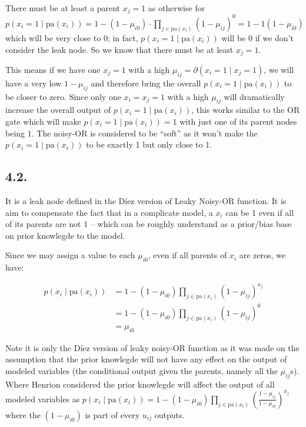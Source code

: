 \documentclass[11pt]{article}
\newcommand{\p}{\partial}
\begin{document}
There must be at least a parent $x_j = 1$ as otherwise for $p(x_i = 1 \mid \textrm{pa}(x_i)) = 1 - (1 - \mu_{i0}) \cdot \prod_{j \in \textrm{pa}(x_i)} (1 - \mu_{ij})^0 = 1 - 1(1 - \mu_{i0})$ which will be very close to $0$; in fact, $p(x_i = 1 \mid \textrm{pa}(x_i))$ will be $0$ if we don't consider the leak node. So we know that there must be at least $x_j = 1$.\newline

This means if we have one $x_j = 1$ with a high $\mu_{ij} = \p(x_i = 1 \mid x_j = 1)$, we will have a very low $1 - \mu_{ij}$ and therefore bring the overall $p(x_i = 1 \mid \textrm{pa}(x_i))$ to be closer to zero. Since only one $x_i = x_j = 1$ with a high $\mu_{ij}$ will dramatically increase the overall output of  $p(x_i = 1 \mid \textrm{pa}(x_i))$, this works similar to the OR gate which will make $p(x_i = 1 \mid \textrm{pa}(x_i)) = 1$ with just one of its parent nodes being $1$. The noisy-OR is considered to be ``soft'' as it won't make the $p(x_i = 1 \mid \textrm{pa}(x_i))$ to be exactly 1 but only close to 1.

\subsection*{4.2.}

It is a leak node defined in the D\'{i}ez version of Leaky Noisy-OR function. It is aim to compensate the fact that in a complicate model, a $x_i$ can be 1 even if all of its parents are not 1 -- which can be roughly understand as a prior/bias base on prior knowlegde to the model.

Since we may assign a value to each $\mu_{i0}$, even if all parents of $x_i$ are zeros, we have:

\begin{align*}
    p(x_i \mid \textrm{pa}({x_i})) &= 1 - (1 - \mu_{i0}) \prod_{j \in \textrm{pa}(x_i)}(1 - \mu_{ij})^{x_j} \\
    &= 1 - (1 - \mu_{i0}) \prod_{j \in \textrm{pa}(x_i)}(1 - \mu_{ij})^0 \\
    &= \mu_{i0}
\end{align*}

Note it is only the D\'{i}ez version of leaky noisy-OR function as it was made on the assumption that the prior knowlegde will not have any effect on the output of modeled variables (the conditional output given the parents, namely all the $\mu_{ij}$s). Where Henrion considered the prior knowlegde will affect the output of all modeled variables as $p(x_i \mid \textrm{pa}({x_i})) = 1 - (1 - \mu_{i0}) \prod_{j \in \textrm{pa}(x_i)}(\frac{1 - \mu_{ij}}{1 - \mu_{i0}})^{x_j}$ where the $(1 - \mu_{i0})$ is part of every $u_{ij}$ outputs.
\end{document}
